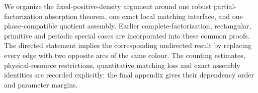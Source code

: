 We organize the fixed-positive-density argument around one robust partial-factorization absorption theorem, one exact local matching interface, and one phase-compatible quotient assembly. Earlier complete-factorization, rectangular, primitive and periodic special cases are incorporated into these common proofs. The directed statement implies the corresponding undirected result by replacing every edge with two opposite arcs of the same colour. The counting estimates, physical-resource restrictions, quantitative matching loss and exact assembly identities are recorded explicitly; the final appendix gives their dependency order and parameter margins.
